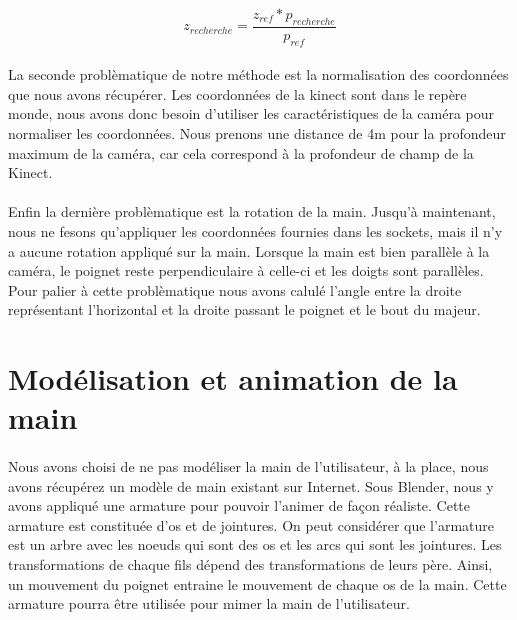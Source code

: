 \begin{equation}
 z_{recherche} = \frac{z_{ref} * p_{recherche}}{p_{ref}}
\end{equation}

\paragraph{}
La seconde problèmatique de notre méthode est la normalisation des coordonnées que nous avons récupérer. Les coordonnées
de la kinect sont dans le repère monde, nous avons donc besoin d'utiliser les caractéristiques de la caméra pour normaliser
les coordonnées. Nous prenons une distance de 4m pour la profondeur maximum de la caméra, car cela correspond à la profondeur 
de champ de la Kinect.

\paragraph{}
Enfin la dernière problèmatique est la rotation de la main. Jusqu'à maintenant, nous ne fesons qu'appliquer les coordonnées
fournies dans les sockets, mais il n'y a aucune rotation appliqué sur la main. Lorsque la main est bien parallèle à la caméra,
le poignet reste perpendiculaire à celle-ci et les doigts sont parallèles. Pour palier à cette problèmatique nous avons calulé
l'angle entre la droite représentant l'horizontal et la droite passant le poignet et le bout du majeur.


\section{Modélisation et animation de la main}
\paragraph{}
Nous avons choisi de ne pas modéliser la main de l'utilisateur, à la place, nous avons récupérez un modèle de main existant sur Internet.
Sous Blender, nous y avons appliqué une armature pour pouvoir l'animer de façon réaliste. Cette armature est constituée d'os et de jointures. On peut considérer que l'armature est un arbre avec les noeuds qui sont des os et les arcs qui sont les jointures. Les transformations de chaque fils dépend des transformations de leurs père. Ainsi, un mouvement du poignet entraine le mouvement de chaque os de la main. 
Cette armature pourra être utilisée pour mimer la main de l'utilisateur. 


